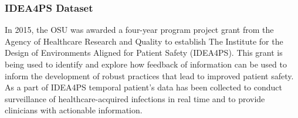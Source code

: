 %

%



\subsubsection{IDEA4PS Dataset}
In 2015, the OSU was awarded a four-year program project grant from the Agency of Healthcare Research and Quality to establish The Institute for the Design of Environments Aligned for Patient Safety (IDEA4PS). This grant is being used to identify and explore how feedback of information can be used to inform the development of robust practices that lead to improved patient safety. As a part of IDEA4PS temporal patient's data has been collected to conduct surveillance of healthcare-acquired infections in real time and to provide clinicians with actionable information. 

